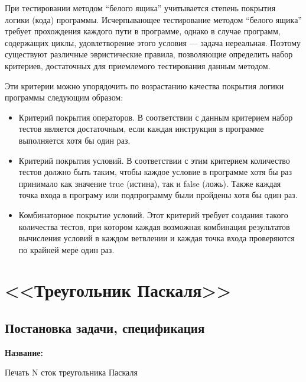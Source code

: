 \documentclass[12pt]{article}
\begin{document}
При тестировании методом “белого ящика” учитывается степень покрытия логики (кода) программы. Исчерпывающее тестирование методом “белого ящика” требует прохождения каждого пути в программе,
однако в случае программ, содержащих циклы, удовлетворение этого
условия — задача нереальная. Поэтому существуют различные эвристические правила, позволяющие определить набор критериев, достаточных
для приемлемого тестирования данным методом.

Эти критерии можно упорядочить по возрастанию качества покрытия логики программы следующим образом:


\begin{itemize}
\item Критерий покрытия операторов. В соответствии с данным критерием набор тестов является достаточным, если каждая инструкция
в программе выполняется хотя бы один раз.

\item Критерий покрытия условий. В соответствии с этим критерием
количество тестов должно быть таким, чтобы каждое условие в
программе хотя бы раз принимало как значение true (истина), так
и false (ложь). Также каждая точка входа в програму или
подпрограмму были пройдены хотя бы один раз.



\item Комбинаторное покрытие условий. Этот критерий требует создания такого количества тестов, при котором каждая возможная комбинация результатов вычисления условий в каждом ветвлении и каждая точка входа проверяются по крайней мере один раз.


\end{itemize}










\section{<<Треугольник Паскаля>>}





\subsection{Постановка задачи, спецификация}

{\bf Название:}

Печать N сток треугольника Паскаля
\end{document}
